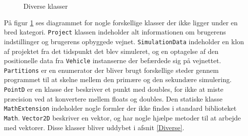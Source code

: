\begin{figure}[H]
    \centering
    \caption{Diverse klasser}
    \label{kdDiverse}
\end{figure}

På figur \ref{kdDiverse} ses diagrammet for nogle forskellige klasser der ikke ligger under en bred kategori. \texttt{Project} klassen indeholder alt informationen om brugerens indstillinger og brugerens opbyggede vejnet. \texttt{SimulationData} indeholder en klon af projektet fra det tidspunkt det blev simuleret, og en optagelse af den positionelle data fra \texttt{Vehicle} instanserne der befærdede sig på vejnettet. \texttt{Partitions} er en enumerator der bliver brugt forskellige steder gennem programmet til at skelne mellem den primære og den sekundære simulering. \texttt{PointD} er en klasse der beskriver et punkt med doubles, for ikke at miste præcision ved at konvertere mellem floats og doubles. Den statiske klasse \texttt{MathExtension} indeholder nogle formler der ikke findes i standard biblioteket \texttt{Math}. \texttt{Vector2D} beskriver en vektor, og har nogle hjælpe metoder til at arbejde med vektorer. Disse klasser bliver uddybet i afsnit \ref{Diverse}.

